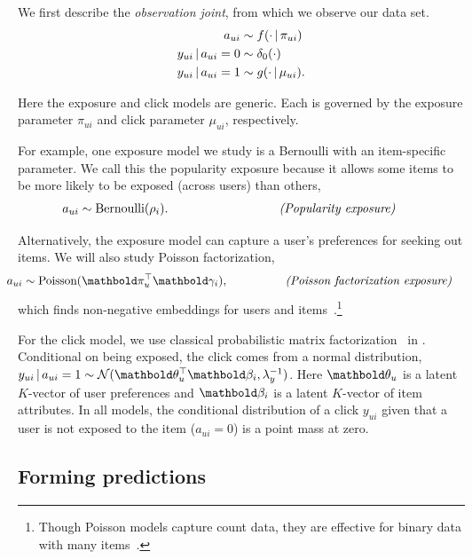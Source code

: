 We first describe the \textit{observation joint}, from which we
observe our data set.
\begin{align*}
  a_{ui} & \sim f(\cdot \,\vert\, \pi_{ui}) \\
  y_{ui} \,\vert\, a_{ui}=0 & \sim \delta_{0}(\cdot) \\
  y_{ui} \,\vert\, a_{ui}=1 & \sim g(\cdot \,\vert\, \mu_{ui}).
\end{align*}

Here the exposure and click models are generic.  Each is governed by
the exposure parameter $\pi_{ui}$ and click parameter $\mu_{ui}$,
respectively.

For example, one exposure model we study is a Bernoulli with an
item-specific parameter.  We call this the popularity exposure because
it allows some items to be more likely to be exposed (across users)
than others,
\begin{align}
\kern-1em a_{ui} &\sim \mathrm{Bernoulli}(\rho_i). & \qquad\qquad\qquad\qquad\textit{(Popularity exposure)} &
  \label{eq:popularity}
\end{align}

Alternatively, the exposure model can capture a user's preferences for
seeking out items.  We will also study Poisson factorization,
\begin{align}
  \kern-1em a_{ui} &\sim \textrm{Poisson}(\mb\pi_u^\top \mb\gamma_i),
  & \qquad\qquad\textit{(Poisson factorization exposure)}&
  \label{eq:poisson-factorization}
\end{align} which finds
non-negative embeddings for users and
items~\citep{Gopalan:2015}.\footnote{Though Poisson models capture
  count data, they are effective for binary data with many
  items~\citep{Gopalan:2015}.}

For the click model, we use classical probabilistic matrix
factorization~\citep{mnih2007probabilistic} in . Conditional on being
exposed, the click comes from a normal distribution,
$y_{ui} \g a_{ui} = 1 \sim \cN(\mb\theta_u^\top \mb\beta_i,
\lambda_y^{-1})$.
Here $\mb\theta_u$ is a latent $K$-vector of user preferences and
$\mb\beta_i$ is a latent $K$-vector of item attributes. In all models,
the conditional distribution of a click $y_{ui}$ given that a user is
not exposed to the item ($a_{ui} = 0$) is a point mass at zero.


\subsection{Forming predictions}  

